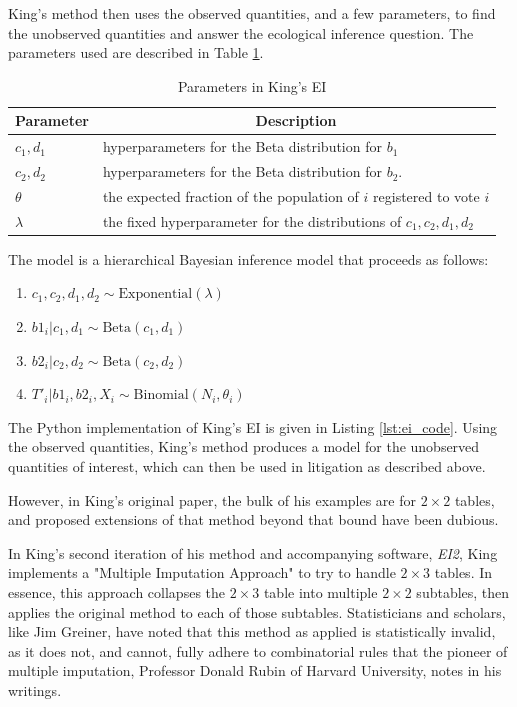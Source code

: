 King's method then uses the observed quantities, and a few parameters, to find the unobserved quantities and answer the ecological inference question. The parameters used are described in Table \ref{table:ei_params}.

\begin{table}[ht]
 \centering
 \caption{Parameters in King's EI}
 \label{table:ei_params}
 \begin{tabular}{|l|l|}
  \hline
  \multicolumn{1}{|c|}{Parameter} & \multicolumn{1}{|c|}{Description}                                     \\
  \hline
  $c_1, d_1$                     & hyperparameters for the Beta distribution for $b_1$                   \\
  $c_2, d_2$                     & hyperparameters for the Beta distribution for $b_2$.                  \\
  $\theta$                       & the expected fraction of the population of $i$ registered to vote $i$ \\
  $\lambda$                      & the fixed hyperparameter for the distributions of $c_1, c_2, d_1, d_2$ \\
  \hline
 \end{tabular}
\end{table}

The model is a hierarchical Bayesian inference model that proceeds as follows:

\begin{enumerate}
 \item $c_1, c_2, d_1, d_2 \sim \text{Exponential}(\lambda)$
 \item $b1_i | c_1, d_1 \sim \text{Beta}(c_1, d_1)$
 \item $b2_i | c_2, d_2 \sim \text{Beta}(c_2, d_2)$
 \item $T'_i | b1_i, b2_i, X_i \sim \text{Binomial}(N_i, \theta_i)$
\end{enumerate}

The Python implementation of King's EI is given in Listing \ref{lst:ei_code}. Using the observed quantities, King's method produces a model for the unobserved quantities of interest, which can then be used in litigation as described above.

However, in King's original paper, the bulk of his examples are for $2 \times 2$ tables, and proposed extensions of that method beyond that bound have been dubious.

In King's second iteration of his method and accompanying software, \textit{EI2}, King implements a "Multiple Imputation Approach" to try to handle $2 \times 3$ tables. In essence, this approach collapses the $2 \times 3$ table into multiple $2 \times 2$ subtables, then applies the original method to each of those subtables.\cite{king2013} Statisticians and scholars, like Jim Greiner, have noted that this method as applied is statistically invalid, as it does not, and cannot, fully adhere to combinatorial rules that the pioneer of multiple imputation, Professor Donald Rubin of Harvard University, notes in his writings.\cite{rubin}

